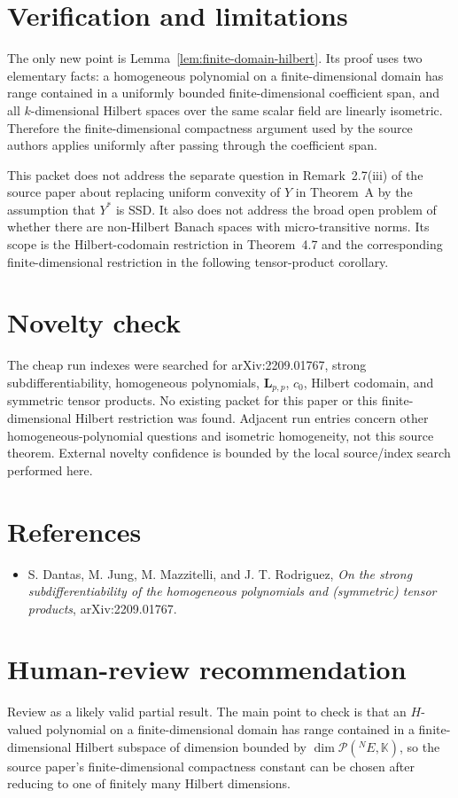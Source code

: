 \documentclass[11pt]{article}
\newcommand{\K}{\mathbb K}
\newcommand{\cP}{\mathcal P}
\newcommand{\Lpp}{\mathbf L_{p,p}}
\begin{document}
\section*{Verification and limitations}

The only new point is Lemma~\ref{lem:finite-domain-hilbert}.  Its proof uses
two elementary facts: a homogeneous polynomial on a finite-dimensional domain
has range contained in a uniformly bounded finite-dimensional coefficient
span, and all \(k\)-dimensional Hilbert spaces over the same scalar field are
linearly isometric.  Therefore the finite-dimensional compactness argument
used by the source authors applies uniformly after passing through the
coefficient span.

This packet does not address the separate question in Remark~2.7(iii) of the
source paper about replacing uniform convexity of \(Y\) in Theorem~A by the
assumption that \(Y^*\) is SSD.  It also does not address the broad open
problem of whether there are non-Hilbert Banach spaces with micro-transitive
norms.  Its scope is the Hilbert-codomain restriction in Theorem~4.7 and the
corresponding finite-dimensional restriction in the following tensor-product
corollary.

\section*{Novelty check}

The cheap run indexes were searched for arXiv:2209.01767, strong
subdifferentiability, homogeneous polynomials, \(\Lpp\), \(c_0\), Hilbert
codomain, and symmetric tensor products.  No existing packet for this paper or
this finite-dimensional Hilbert restriction was found.  Adjacent run entries
concern other homogeneous-polynomial questions and isometric homogeneity, not
this source theorem.  External novelty confidence is bounded by the local
source/index search performed here.

\section*{References}

\begin{itemize}
\item S. Dantas, M. Jung, M. Mazzitelli, and J. T. Rodriguez,
\emph{On the strong subdifferentiability of the homogeneous polynomials and
(symmetric) tensor products}, arXiv:2209.01767.
\end{itemize}

\section*{Human-review recommendation}

Review as a likely valid partial result.  The main point to check is that an
\(H\)-valued polynomial on a finite-dimensional domain has range contained in a
finite-dimensional Hilbert subspace of dimension bounded by
\(\dim\cP(^N E,\K)\), so the source paper's finite-dimensional compactness
constant can be chosen after reducing to one of finitely many Hilbert
dimensions.
\end{document}
